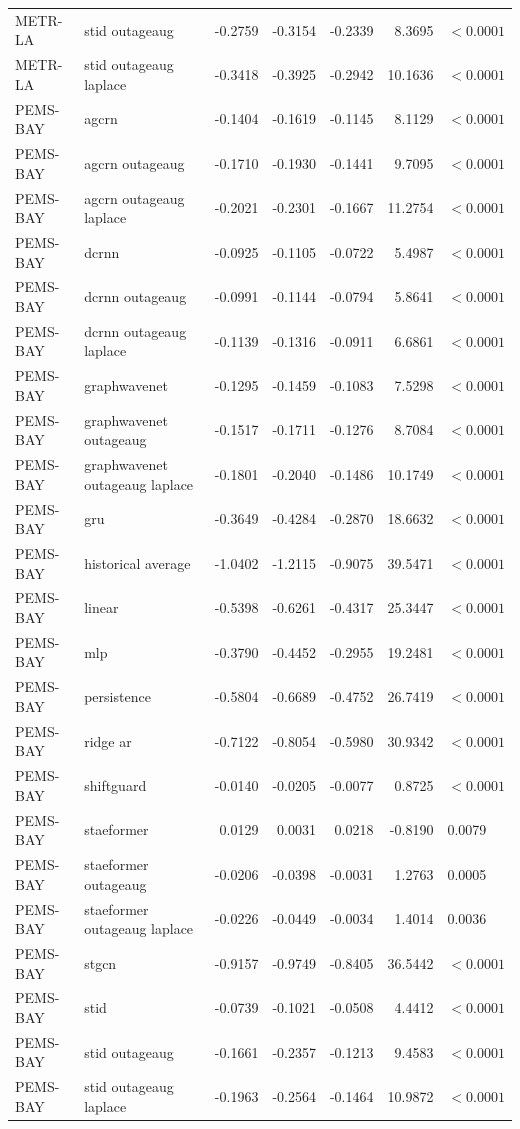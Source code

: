 \begin{tabular}{llrrrrl}
METR-LA & stid outageaug & -0.2759 & -0.3154 & -0.2339 & 8.3695 & $<0.0001$ \\
METR-LA & stid outageaug laplace & -0.3418 & -0.3925 & -0.2942 & 10.1636 & $<0.0001$ \\
PEMS-BAY & agcrn & -0.1404 & -0.1619 & -0.1145 & 8.1129 & $<0.0001$ \\
PEMS-BAY & agcrn outageaug & -0.1710 & -0.1930 & -0.1441 & 9.7095 & $<0.0001$ \\
PEMS-BAY & agcrn outageaug laplace & -0.2021 & -0.2301 & -0.1667 & 11.2754 & $<0.0001$ \\
PEMS-BAY & dcrnn & -0.0925 & -0.1105 & -0.0722 & 5.4987 & $<0.0001$ \\
PEMS-BAY & dcrnn outageaug & -0.0991 & -0.1144 & -0.0794 & 5.8641 & $<0.0001$ \\
PEMS-BAY & dcrnn outageaug laplace & -0.1139 & -0.1316 & -0.0911 & 6.6861 & $<0.0001$ \\
PEMS-BAY & graphwavenet & -0.1295 & -0.1459 & -0.1083 & 7.5298 & $<0.0001$ \\
PEMS-BAY & graphwavenet outageaug & -0.1517 & -0.1711 & -0.1276 & 8.7084 & $<0.0001$ \\
PEMS-BAY & graphwavenet outageaug laplace & -0.1801 & -0.2040 & -0.1486 & 10.1749 & $<0.0001$ \\
PEMS-BAY & gru & -0.3649 & -0.4284 & -0.2870 & 18.6632 & $<0.0001$ \\
PEMS-BAY & historical average & -1.0402 & -1.2115 & -0.9075 & 39.5471 & $<0.0001$ \\
PEMS-BAY & linear & -0.5398 & -0.6261 & -0.4317 & 25.3447 & $<0.0001$ \\
PEMS-BAY & mlp & -0.3790 & -0.4452 & -0.2955 & 19.2481 & $<0.0001$ \\
PEMS-BAY & persistence & -0.5804 & -0.6689 & -0.4752 & 26.7419 & $<0.0001$ \\
PEMS-BAY & ridge ar & -0.7122 & -0.8054 & -0.5980 & 30.9342 & $<0.0001$ \\
PEMS-BAY & shiftguard & -0.0140 & -0.0205 & -0.0077 & 0.8725 & $<0.0001$ \\
PEMS-BAY & staeformer & 0.0129 & 0.0031 & 0.0218 & -0.8190 & 0.0079 \\
PEMS-BAY & staeformer outageaug & -0.0206 & -0.0398 & -0.0031 & 1.2763 & 0.0005 \\
PEMS-BAY & staeformer outageaug laplace & -0.0226 & -0.0449 & -0.0034 & 1.4014 & 0.0036 \\
PEMS-BAY & stgcn & -0.9157 & -0.9749 & -0.8405 & 36.5442 & $<0.0001$ \\
PEMS-BAY & stid & -0.0739 & -0.1021 & -0.0508 & 4.4412 & $<0.0001$ \\
PEMS-BAY & stid outageaug & -0.1661 & -0.2357 & -0.1213 & 9.4583 & $<0.0001$ \\
PEMS-BAY & stid outageaug laplace & -0.1963 & -0.2564 & -0.1464 & 10.9872 & $<0.0001$ \\
\bottomrule
\end{tabular}
